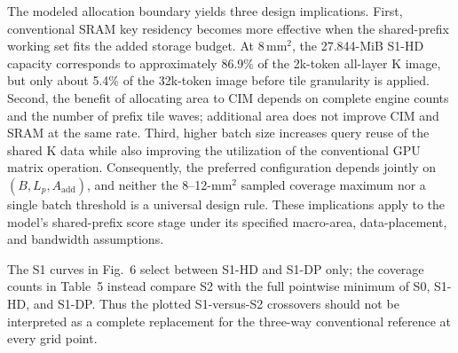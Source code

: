 The modeled allocation boundary yields three design implications. First, conventional SRAM key residency becomes more effective when the shared-prefix working set fits the added storage budget. At 8\,mm$^2$, the 27.844-MiB S1-HD capacity corresponds to approximately 86.9\% of the 2k-token all-layer K image, but only about 5.4\% of the 32k-token image before tile granularity is applied. Second, the benefit of allocating area to CIM depends on complete engine counts and the number of prefix tile waves; additional area does not improve CIM and SRAM at the same rate. Third, higher batch size increases query reuse of the shared K data while also improving the utilization of the conventional GPU matrix operation. Consequently, the preferred configuration depends jointly on $(B,L_p,A_{\mathrm{add}})$, and neither the 8--12-mm$^2$ sampled coverage maximum nor a single batch threshold is a universal design rule. These implications apply to the model's shared-prefix score stage under its specified macro-area, data-placement, and bandwidth assumptions.

The S1 curves in Fig.~6 select between S1-HD and S1-DP only; the coverage counts in Table~5 instead compare S2 with the full pointwise minimum of S0, S1-HD, and S1-DP. Thus the plotted S1-versus-S2 crossovers should not be interpreted as a complete replacement for the three-way conventional reference at every grid point.

